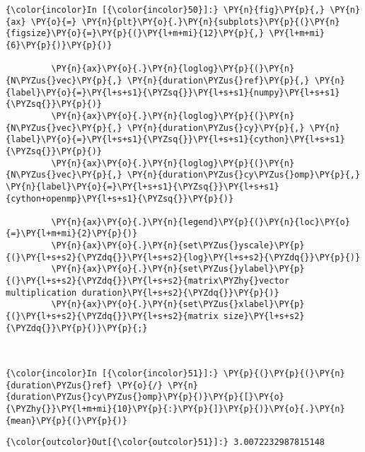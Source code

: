    \begin{Verbatim}[commandchars=\\\{\}]
{\color{incolor}In [{\color{incolor}50}]:} \PY{n}{fig}\PY{p}{,} \PY{n}{ax} \PY{o}{=} \PY{n}{plt}\PY{o}{.}\PY{n}{subplots}\PY{p}{(}\PY{n}{figsize}\PY{o}{=}\PY{p}{(}\PY{l+m+mi}{12}\PY{p}{,} \PY{l+m+mi}{6}\PY{p}{)}\PY{p}{)}
         
         \PY{n}{ax}\PY{o}{.}\PY{n}{loglog}\PY{p}{(}\PY{n}{N\PYZus{}vec}\PY{p}{,} \PY{n}{duration\PYZus{}ref}\PY{p}{,} \PY{n}{label}\PY{o}{=}\PY{l+s+s1}{\PYZsq{}}\PY{l+s+s1}{numpy}\PY{l+s+s1}{\PYZsq{}}\PY{p}{)}
         \PY{n}{ax}\PY{o}{.}\PY{n}{loglog}\PY{p}{(}\PY{n}{N\PYZus{}vec}\PY{p}{,} \PY{n}{duration\PYZus{}cy}\PY{p}{,} \PY{n}{label}\PY{o}{=}\PY{l+s+s1}{\PYZsq{}}\PY{l+s+s1}{cython}\PY{l+s+s1}{\PYZsq{}}\PY{p}{)}
         \PY{n}{ax}\PY{o}{.}\PY{n}{loglog}\PY{p}{(}\PY{n}{N\PYZus{}vec}\PY{p}{,} \PY{n}{duration\PYZus{}cy\PYZus{}omp}\PY{p}{,} \PY{n}{label}\PY{o}{=}\PY{l+s+s1}{\PYZsq{}}\PY{l+s+s1}{cython+openmp}\PY{l+s+s1}{\PYZsq{}}\PY{p}{)}
         
         \PY{n}{ax}\PY{o}{.}\PY{n}{legend}\PY{p}{(}\PY{n}{loc}\PY{o}{=}\PY{l+m+mi}{2}\PY{p}{)}
         \PY{n}{ax}\PY{o}{.}\PY{n}{set\PYZus{}yscale}\PY{p}{(}\PY{l+s+s2}{\PYZdq{}}\PY{l+s+s2}{log}\PY{l+s+s2}{\PYZdq{}}\PY{p}{)}
         \PY{n}{ax}\PY{o}{.}\PY{n}{set\PYZus{}ylabel}\PY{p}{(}\PY{l+s+s2}{\PYZdq{}}\PY{l+s+s2}{matrix\PYZhy{}vector multiplication duration}\PY{l+s+s2}{\PYZdq{}}\PY{p}{)}
         \PY{n}{ax}\PY{o}{.}\PY{n}{set\PYZus{}xlabel}\PY{p}{(}\PY{l+s+s2}{\PYZdq{}}\PY{l+s+s2}{matrix size}\PY{l+s+s2}{\PYZdq{}}\PY{p}{)}\PY{p}{;}
\end{Verbatim}
\begin{center}
    \end{center}
    { \hspace*{\fill} \\}




    \begin{Verbatim}[commandchars=\\\{\}]
{\color{incolor}In [{\color{incolor}51}]:} \PY{p}{(}\PY{p}{(}\PY{n}{duration\PYZus{}ref} \PY{o}{/} \PY{n}{duration\PYZus{}cy\PYZus{}omp}\PY{p}{)}\PY{p}{[}\PY{o}{\PYZhy{}}\PY{l+m+mi}{10}\PY{p}{:}\PY{p}{]}\PY{p}{)}\PY{o}{.}\PY{n}{mean}\PY{p}{(}\PY{p}{)}
\end{Verbatim}

            \begin{Verbatim}[commandchars=\\\{\}]
{\color{outcolor}Out[{\color{outcolor}51}]:} 3.0072232987815148
\end{Verbatim}
        


